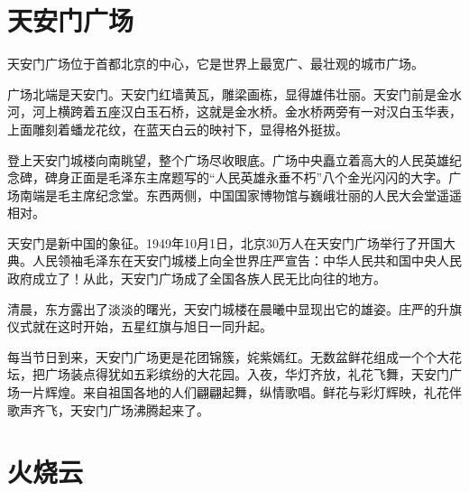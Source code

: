 \documentclass[12pt,UTF-8,openany]{ctexbook}
\begin{document}
\chapter{天安门广场}

\begin{large}
    
    天安门广场位于首都北京的中心，它是世界上最宽广、最壮观的城市广场。
    
    广场北端是天安门。天安门红墙黄瓦，雕梁画栋，显得雄伟壮丽。天安门前是金水河，河上横跨着五座汉白玉石桥，这就是金水桥。金水桥两旁有一对汉白玉华表，上面雕刻着蟠龙花纹，在蓝天白云的映衬下，显得格外挺拔。
    
    登上天安门城楼向南眺望，整个广场尽收眼底。广场中央矗立着高大的人民英雄纪念碑，碑身正面是毛泽东主席题写的“人民英雄永垂不朽”八个金光闪闪的大字。广场南端是毛主席纪念堂。东西两侧，中国国家博物馆与巍峨壮丽的人民大会堂遥遥相对。
    
    天安门是新中国的象征。1949年10月1日，北京30万人在天安门广场举行了开国大典。人民领袖毛泽东在天安门城楼上向全世界庄严宣告：中华人民共和国中央人民政府成立了！从此，天安门广场成了全国各族人民无比向往的地方。
    
    清晨，东方露出了淡淡的曙光，天安门城楼在晨曦中显现出它的雄姿。庄严的升旗仪式就在这时开始，五星红旗与旭日一同升起。
    
    每当节日到来，天安门广场更是花团锦簇，姹紫嫣红。无数盆鲜花组成一个个大花坛，把广场装点得犹如五彩缤纷的大花园。入夜，华灯齐放，礼花飞舞，天安门广场一片辉煌。来自祖国各地的人们翩翩起舞，纵情歌唱。鲜花与彩灯辉映，礼花伴歌声齐飞，天安门广场沸腾起来了。
    
\end{large}



\chapter{火烧云}
\end{document}
